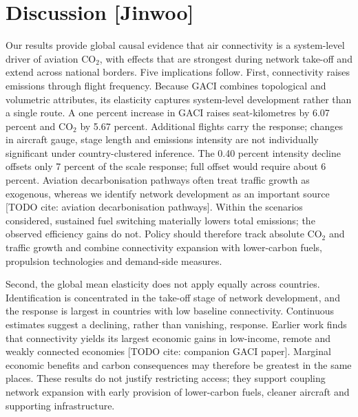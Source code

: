 \documentclass[12pt]{article}
\begin{document}
\section*{Discussion [Jinwoo]}
Our results provide global causal evidence that air connectivity is a system-level driver of aviation CO$_2$, with effects that are strongest during network take-off and extend across national borders. Five implications follow. First, connectivity raises emissions through flight frequency. Because GACI combines topological and volumetric attributes, its elasticity captures system-level development rather than a single route. A one percent increase in GACI raises seat-kilometres by 6.07 percent and CO$_2$ by 5.67 percent. Additional flights carry the response; changes in aircraft gauge, stage length and emissions intensity are not individually significant under country-clustered inference. The 0.40 percent intensity decline offsets only 7 percent of the scale response; full offset would require about 6 percent. Aviation decarbonisation pathways often treat traffic growth as exogenous, whereas we identify network development as an important source [TODO cite: aviation decarbonisation pathways]. Within the scenarios considered, sustained fuel switching materially lowers total emissions; the observed efficiency gains do not. Policy should therefore track absolute CO$_2$ and traffic growth and combine connectivity expansion with lower-carbon fuels, propulsion technologies and demand-side measures.

Second, the global mean elasticity does not apply equally across countries. Identification is concentrated in the take-off stage of network development, and the response is largest in countries with low baseline connectivity. Continuous estimates suggest a declining, rather than vanishing, response. Earlier work finds that connectivity yields its largest economic gains in low-income, remote and weakly connected economies [TODO cite: companion GACI paper]. Marginal economic benefits and carbon consequences may therefore be greatest in the same places. These results do not justify restricting access; they support coupling network expansion with early provision of lower-carbon fuels, cleaner aircraft and supporting infrastructure.
\end{document}
